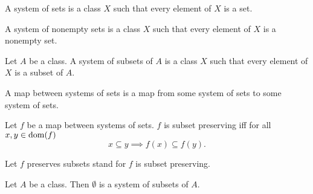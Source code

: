\documentclass[10pt]{article}
\begin{document}
  \begin{forthel}
    \begin{definition}
      A system of sets is a class $X$ such that every element of $X$ is a set.
    \end{definition}
  \end{forthel}

  \begin{forthel}
    \begin{definition}
      A system of nonempty sets is a class $X$ such that every element of $X$ is
      a nonempty set.
    \end{definition}
  \end{forthel}

  \begin{forthel}
    \begin{definition}
      Let $A$ be a class.
      A system of subsets of $A$ is a class $X$ such that every element of $X$
      is a subset of $A$.
    \end{definition}
  \end{forthel}

  \begin{forthel}
    \begin{definition}
      A map between systems of sets is a map from some system of sets to some
      system of sets.
    \end{definition}
  \end{forthel}

  \begin{forthel}
    \begin{definition}
      Let $f$ be a map between systems of sets.
      $f$ is subset preserving iff for all $x, y \in \operatorname{dom}(f)$
      \[ x \subseteq y \implies f(x) \subseteq f(y). \]
    \end{definition}

    Let $f$ preserves subsets stand for $f$ is subset preserving.
  \end{forthel}

  \begin{forthel}
    \begin{proposition}
      Let $A$ be a class.
      Then $\emptyset$ is a system of subsets of $A$.
    \end{proposition}
  \end{forthel}
\end{document}
